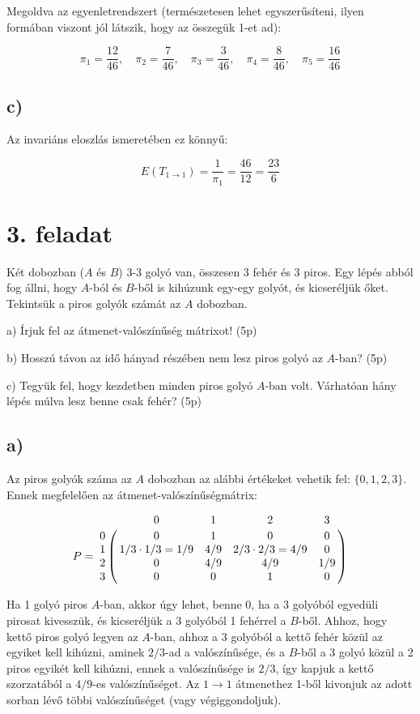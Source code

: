 \documentclass[a4paper,12pt]{article}
\begin{document}
Megoldva az egyenletrendszert (természetesen lehet egyszerűsíteni, 
ilyen formában viszont jól látszik, hogy az összegük 1-et ad):

\[
\pi_1 = \frac{12}{46}, \quad
\pi_2 = \frac{7}{46}, \quad
\pi_3 = \frac{3}{46}, \quad
\pi_4 = \frac{8}{46}, \quad
\pi_5 = \frac{16}{46}
\]

\subsection*{c)}
Az invariáns eloszlás ismeretében ez könnyű:

\[
E(T_{1 \to 1}) = \frac{1}{\pi_1} = \frac{46}{12} = \frac{23}{6}
\]

\section*{3. feladat}
Két dobozban ($A$ és $B$) 3-3 golyó van, összesen 3 fehér és 3 piros. 
Egy lépés abból fog állni, hogy $A$-ból és $B$-ből is kihúzunk egy-egy 
golyót, és kicseréljük őket. Tekintsük a piros golyók számát az $A$
dobozban.

a)	Írjuk fel az átmenet-valószínűség mátrixot! (5p)

b)	Hosszú távon az idő hányad részében nem lesz piros golyó az $A$-ban? (5p)

c)	Tegyük fel, hogy kezdetben minden piros golyó $A$-ban volt. 
Várhatóan hány lépés múlva lesz benne csak fehér? (5p)

\subsection*{a)}
Az piros golyók száma az $A$ dobozban az alábbi értékeket vehetik fel:
$\{0, 1, 2, 3\}$. Ennek megfelelően az átmenet-valószínűségmátrix:

\[
P = 
\bordermatrix{
~	&	0    &    1    &    2    &    3    \cr
0	&	0    &    1    &    0    &    0    \cr
1	&	1/3 \cdot 1/3 = 1/9    &    4/9    &    2/3 \cdot 2/3 = 4/9    &    0    \cr
2	&	0    &    4/9    &    4/9    &    1/9    \cr
3	&	0    &    0    &    1    &    0    }
\]

Ha 1 golyó piros $A$-ban, akkor úgy lehet, benne 0, ha a 3 golyóból 
egyedüli pirosat kivesszük, és kicseréljük a 3 golyóból 1 fehérrel 
a $B$-ből. Ahhoz, hogy kettő piros golyó legyen az $A$-ban, ahhoz a 3 
golyóból a kettő fehér közül az egyiket kell kihúzni, aminek $2/3$-ad 
a valószínűsége, és a $B$-ből a 3 golyó közül a 2 piros egyikét kell
kihúzni, ennek a valószínűsége is $2/3$, így kapjuk a kettő szorzatából
a $4/9$-es valószínűséget. Az $1 \to 1$ átmenethez 1-ből kivonjuk az 
adott sorban lévő többi valószínűséget (vagy végiggondoljuk).
\end{document}

